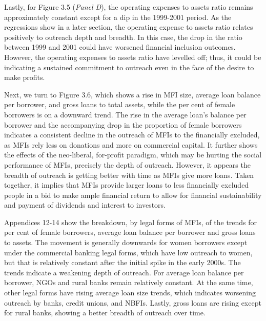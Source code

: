 \documentclass[a4paper, nobind]{templates/ociamthesis}
\begin{document}
Lastly, for Figure 3.5 (\emph{Panel D}), the operating expenses to assets ratio remains approximately constant except for a dip in the 1999-2001 period. As the regressions show in a later section, the operating expense to assets ratio relates positively to outreach depth and breadth. In this case, the drop in the ratio between 1999 and 2001 could have worsened financial inclusion outcomes. However, the operating expenses to assets ratio have levelled off; thus, it could be indicating a sustained commitment to outreach even in the face of the desire to make profits.

Next, we turn to Figure 3.6, which shows a rise in MFI size, average loan balance per borrower, and gross loans to total assets, while the per cent of female borrowers is on a downward trend. The rise in the average loan's balance per borrower and the accompanying drop in the proportion of female borrowers indicates a consistent decline in the outreach of MFIs to the financially excluded, as MFIs rely less on donations and more on commercial capital. It further shows the effects of the neo-liberal, for-profit paradigm, which may be hurting the social performance of MFIs, precisely the depth of outreach. However, it appears the breadth of outreach is getting better with time as MFIs give more loans. Taken together, it implies that MFIs provide larger loans to less financially excluded people in a bid to make ample financial return to allow for financial sustainability and payment of dividends and interest to investors.

Appendices 12-14 show the breakdown, by legal forms of MFIs, of the trends for per cent of female borrowers, average loan balance per borrower and gross loans to assets. The movement is generally downwards for women borrowers except under the commercial banking legal forms, which have low outreach to women, but that is relatively constant after the initial spike in the early 2000s. The trends indicate a weakening depth of outreach. For average loan balance per borrower, NGOs and rural banks remain relatively constant. At the same time, other legal forms have rising average loan size trends, which indicates worsening outreach by banks, credit unions, and NBFIs. Lastly, gross loans are rising except for rural banks, showing a better breadth of outreach over time.
\end{document}
